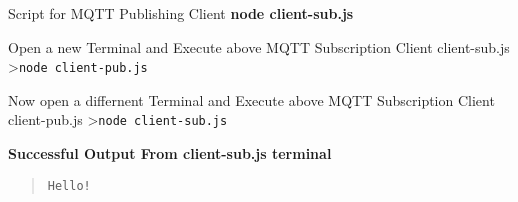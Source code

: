 \documentclass[16pt]{article}
\begin{document}
\begin{enumerate}

Script for MQTT Publishing Client \textbf{node client-sub.js}

 
 

Open a new Terminal and Execute above MQTT Subscription Client
client-sub.js \textgreater{}\texttt{node client-pub.js}

Now open a differnent Terminal and Execute above MQTT Subscription
Client client-pub.js \textgreater{}\texttt{node client-sub.js}

\textbf{Successful Output From client-sub.js terminal}

\begin{quote}
\texttt{Hello!}
\end{quote}

\vspace{0.5cm}


\end{enumerate}
\end{document}
